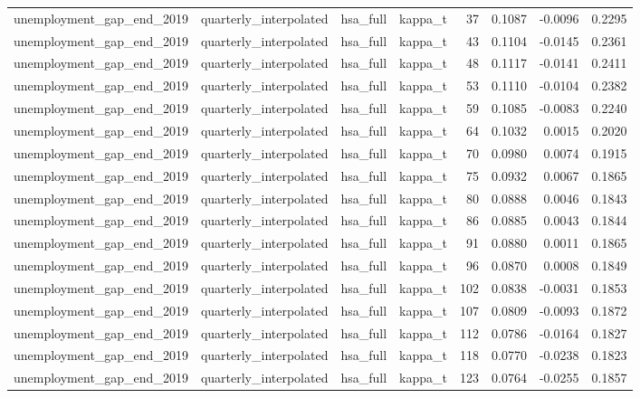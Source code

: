 \begin{tabular}{llllrrrr}
unemployment\_gap\_end\_2019 & quarterly\_interpolated & hsa\_full & kappa\_t & 37 & 0.1087 & -0.0096 & 0.2295 \\
unemployment\_gap\_end\_2019 & quarterly\_interpolated & hsa\_full & kappa\_t & 43 & 0.1104 & -0.0145 & 0.2361 \\
unemployment\_gap\_end\_2019 & quarterly\_interpolated & hsa\_full & kappa\_t & 48 & 0.1117 & -0.0141 & 0.2411 \\
unemployment\_gap\_end\_2019 & quarterly\_interpolated & hsa\_full & kappa\_t & 53 & 0.1110 & -0.0104 & 0.2382 \\
unemployment\_gap\_end\_2019 & quarterly\_interpolated & hsa\_full & kappa\_t & 59 & 0.1085 & -0.0083 & 0.2240 \\
unemployment\_gap\_end\_2019 & quarterly\_interpolated & hsa\_full & kappa\_t & 64 & 0.1032 & 0.0015 & 0.2020 \\
unemployment\_gap\_end\_2019 & quarterly\_interpolated & hsa\_full & kappa\_t & 70 & 0.0980 & 0.0074 & 0.1915 \\
unemployment\_gap\_end\_2019 & quarterly\_interpolated & hsa\_full & kappa\_t & 75 & 0.0932 & 0.0067 & 0.1865 \\
unemployment\_gap\_end\_2019 & quarterly\_interpolated & hsa\_full & kappa\_t & 80 & 0.0888 & 0.0046 & 0.1843 \\
unemployment\_gap\_end\_2019 & quarterly\_interpolated & hsa\_full & kappa\_t & 86 & 0.0885 & 0.0043 & 0.1844 \\
unemployment\_gap\_end\_2019 & quarterly\_interpolated & hsa\_full & kappa\_t & 91 & 0.0880 & 0.0011 & 0.1865 \\
unemployment\_gap\_end\_2019 & quarterly\_interpolated & hsa\_full & kappa\_t & 96 & 0.0870 & 0.0008 & 0.1849 \\
unemployment\_gap\_end\_2019 & quarterly\_interpolated & hsa\_full & kappa\_t & 102 & 0.0838 & -0.0031 & 0.1853 \\
unemployment\_gap\_end\_2019 & quarterly\_interpolated & hsa\_full & kappa\_t & 107 & 0.0809 & -0.0093 & 0.1872 \\
unemployment\_gap\_end\_2019 & quarterly\_interpolated & hsa\_full & kappa\_t & 112 & 0.0786 & -0.0164 & 0.1827 \\
unemployment\_gap\_end\_2019 & quarterly\_interpolated & hsa\_full & kappa\_t & 118 & 0.0770 & -0.0238 & 0.1823 \\
unemployment\_gap\_end\_2019 & quarterly\_interpolated & hsa\_full & kappa\_t & 123 & 0.0764 & -0.0255 & 0.1857 \\

\end{tabular}
